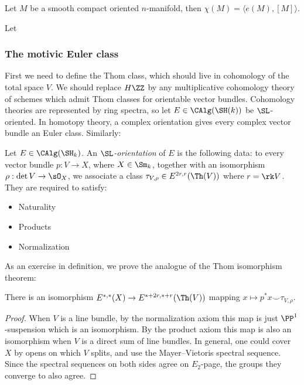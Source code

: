 \begin{theorem}
Let $M$ be a smooth compact oriented $n$-manifold, then $\chi(M) = \langle e(M), [M]\rangle$.
\end{theorem}

\begin{exm}

Let 
	
\end{exm}

\subsubsection{The motivic Euler class}

First we need to define the Thom class, which should live in cohomology of the total space $V$. We should replace $H\ZZ$ by any multiplicative cohomology theory of schemes which admit Thom classes for orientable vector bundles. Cohomology theories are represented by ring spectra, so let $E\in \CAlg(\SH(k))$ be $\SL$-oriented. In homotopy theory, a complex orientation gives every complex vector bundle an Euler class. Similarly:

\begin{definition}
	Let $E\in \CAlg(\SH_k)$. An \emph{$\SL$-orientation} of $E$ is the following data: to every vector bundle $p:V\to X$, where $X\in \Sm_k$, together with an isomorphism $\rho:\det V \to \sO_X$, we associate a class $\tau_{V,\rho} \in E^{2r,r}(\Th(V))$ where $r=\rk V$. They are required to satisfy:
	
	\begin{itemize}
		\item Naturality
		\item Products
		\item Normalization
	\end{itemize}
\end{definition}

As an exercise in definition, we prove the analogue of the Thom isomorphism theorem:

\begin{proposition}

There is an isomorphism $E^{*,*}(X)\to E^{*+2r, *+r}(\Th(V))$ mapping $x\mapsto p^*x\smile \tau_{V,\rho}$.
	
\end{proposition}


\begin{proof}
	When $V$ is a line bundle, by the normalization axiom this map is just $\PP^1$-suspension which is an isomorphism. By the product axiom this map is also an isomorphism when $V$ is a direct sum of line bundles. In general, one could cover $X$ by opens on which $V$ splits, and use the Mayer--Vietoris spectral sequence. Since the spectral sequences on both sides agree on $E_2$-page, the groups they converge to also agree.
\end{proof}

